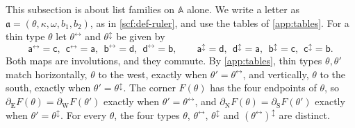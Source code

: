 This subsection is about list families on $\mathbb A$ alone. We write a letter as $\mathfrak a=(\theta,\kappa,\omega,b_1,b_2)$, as in \cref{scf:def-ruler}, and use the tables of \cref{app:tables}. For a thin type $\theta$ let $\theta^{\leftrightarrow}$ and $\theta^{\updownarrow}$ be given by
\[
\mathsf a^{\leftrightarrow}=\mathsf c,\ \ \mathsf c^{\leftrightarrow}=\mathsf a,\ \ \mathsf b^{\leftrightarrow}=\mathsf d,\ \ \mathsf d^{\leftrightarrow}=\mathsf b,\qquad
\mathsf a^{\updownarrow}=\mathsf d,\ \ \mathsf d^{\updownarrow}=\mathsf a,\ \ \mathsf b^{\updownarrow}=\mathsf c,\ \ \mathsf c^{\updownarrow}=\mathsf b .
\]
Both maps are involutions, and they commute. By \cref{app:tables}, thin types $\theta,\theta'$ match horizontally, $\theta$ to the west, exactly when $\theta'=\theta^{\leftrightarrow}$, and vertically, $\theta$ to the south, exactly when $\theta'=\theta^{\updownarrow}$. The corner $F(\theta)$ has the four endpoints of $\theta$, so $\partial_{\mathrm E}F(\theta)=\partial_{\mathrm W}F(\theta')$ exactly when $\theta'=\theta^{\leftrightarrow}$, and $\partial_{\mathrm N}F(\theta)=\partial_{\mathrm S}F(\theta')$ exactly when $\theta'=\theta^{\updownarrow}$. For every $\theta$, the four types $\theta$, $\theta^{\leftrightarrow}$, $\theta^{\updownarrow}$ and $(\theta^{\leftrightarrow})^{\updownarrow}$ are distinct.

